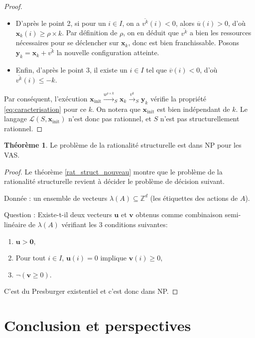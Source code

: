 \documentclass[a4paper,final]{article}
\theoremstyle{definition}
\newtheorem{Theorem}{Théorème}
\let\leq\leqslant
\let\geq\geqslant
\newcommand{\Z}{\ensuremath{\mathbb{Z}}}
\newcommand{\lang}{\ensuremath{\mathcal{L}}}
\newcommand{\trans}[2]{\ensuremath{\stackrel{#1}{\longrightarrow}_{#2}}}
\newcommand{\vect}[1]{\ensuremath{\mathbf{#1}}}
\newcommand{\xinit}{\ensuremath{\vect{x}_\text{init}}}
\newcommand{\valeur}[1]{\ensuremath{\overline{#1}}}
\begin{document}
\begin{proof}
\begin{itemize}
    \item D'après le point 2, si pour un $i\in I$, on a $\valeur{v^k}(i) < 0$, alors $\valeur{u}(i) > 0$, d'où $\vect{x}_k(i) \geq \rho\times k$.
    Par définition de $\rho$, on en déduit que $\valeur{v^k}$ a bien les ressources nécessaires pour se déclencher sur $\vect{x}_k$, donc est bien franchissable.
    Posons $\vect{y}_k = \vect{x}_k + \valeur{v^k}$ la nouvelle configuration atteinte.
    
    \item Enfin, d'après le point 3, il existe un $i\in I$ tel que $\valeur{v}(i) < 0$, d'où $\valeur{v^k}(i) \leq -k$.
\end{itemize}
Par conséquent, l'exécution $\xinit \trans{u^{\rho\times k}}{S} \vect{x}_k \trans{v^k}{S} \vect{y}_k$ vérifie la propriété \eqref{eq:caracterisation} pour ce $k$.
On notera que $\xinit$ est bien indépendant de $k$.
Le langage $\lang(S,\xinit)$ n'est donc pas rationnel, et $S$ n'est pas structurellement rationnel.
\end{proof}

\begin{Theorem}\label{NP conf_struct_rat}
Le  problème de la rationalité structurelle est dans NP pour les VAS.
\end{Theorem}

\begin{proof}
Le théorème \ref{rat_struct_nouveau} montre que le problème de la rationalité structurelle revient à décider le problème de décision suivant.

Donnée : un ensemble de vecteurs $\lambda(A) \subseteq \Z^d$ (les étiquettes des actions de $A$).

Question : Existe-t-il deux vecteurs $\vect{u}$ et $\vect{v}$ obtenus comme combinaison semi-linéaire de $\lambda(A)$ vérifiant les 3 conditions suivantes:
\begin{enumerate}
    \item $\vect{u} > \vect{0}$,
    \item Pour tout $i \in I$, $\vect{u}(i)=0$ implique $\vect{v}(i) \geq 0$,
    \item  $\lnot(\vect{v} \geq 0)$.
\end{enumerate}
C'est du Presburger existentiel et c'est donc dans NP.
\end{proof}

\section{Conclusion et perspectives}
\end{document}
